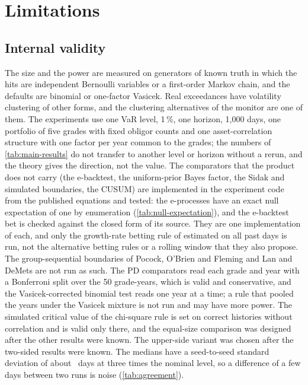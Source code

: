 \section{Limitations}
\label{sec:limitations}

\subsection{Internal validity}
\label{sec:limitations-internal}

The size and the power are measured on generators of known truth in which the hits are independent Bernoulli variables or a first-order Markov chain, and the defaults are binomial or one-factor Vasicek. Real exceedances have volatility clustering of other forms, and the clustering alternatives of the monitor are one of them. The experiments use one VaR level, 1\,\%, one horizon, 1,000 days, one portfolio of five grades with fixed obligor counts and one
asset-correlation structure with one factor per year common to the grades; the numbers of \cref{tab:main-results} do not transfer to another level or horizon without a rerun, and the theory gives the direction, not the value. The comparators that the product does not carry (the e-backtest, the uniform-prior Bayes factor, the Sidak and simulated boundaries, the CUSUM) are implemented in the experiment code from the published equations and tested: the e-processes have an exact null expectation of one by enumeration (\cref{tab:null-expectation}),
and the e-backtest bet is checked against the closed form of its source. They are one implementation of each, and only the growth-rate betting rule of \citet{wang2022} estimated on all past days is run, not the alternative betting rules or a rolling window that they also propose. The group-sequential boundaries of Pocock, O'Brien and Fleming and Lan and DeMets are not run as such. The PD comparators read each grade and year with a Bonferroni split over the 50 grade-years, which is valid and conservative, and the Vasicek-corrected binomial test reads one year at a time; a rule that pooled the years under the Vasicek mixture is not run and may have more power. The simulated critical value of the chi-square rule is set on correct histories without correlation and is valid only there, and the equal-size comparison was designed after the other results were known. The upper-side variant was chosen after the two-sided results were known.
The medians have a seed-to-seed standard deviation of about \nSeedsThreeSeedSd\ days at three times the nominal level, so a difference of a few days between two runs is noise (\cref{tab:agreement}).

